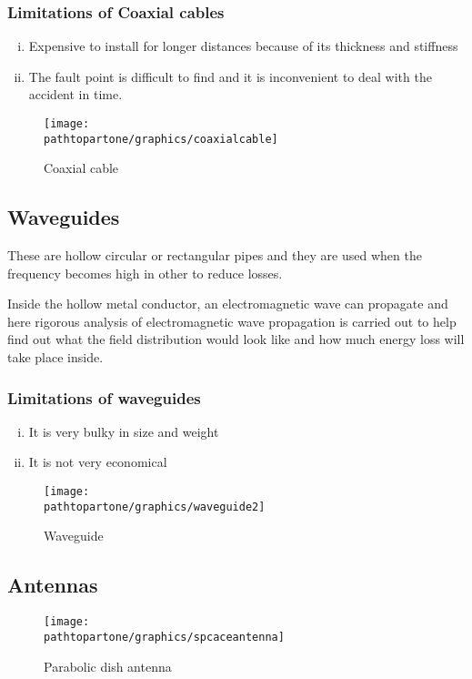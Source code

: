 \subsubsection{Limitations of Coaxial cables}
\begin{enumerate}[(i)]
\item Expensive to install for longer distances because of its thickness and stiffness
\item The fault point is difficult to find and it is inconvenient to deal with the accident in time.
\end{enumerate}

\begin{figure}[h]
\centering
\texttt{[image: \\pathtopartone/graphics/coaxialcable]}
\caption{Coaxial cable}
\end{figure}

\subsection{Waveguides}
These are hollow circular or rectangular pipes and they are used when the frequency becomes high in other to reduce losses. 

Inside the hollow metal conductor, an electromagnetic wave can propagate and here rigorous analysis of electromagnetic wave propagation is carried out to help find out what the field distribution would look like and how much energy loss will take place inside.

\subsubsection{Limitations of waveguides}
\begin{enumerate}[(i)]
\item It is very bulky in size and weight
\item It is not very economical
\end{enumerate}

\begin{figure}[h]
\centering
\texttt{[image: \\pathtopartone/graphics/waveguide2]}
\caption{Waveguide}
\end{figure}

\subsection{Antennas}
\begin{figure}[h]
\centering
\texttt{[image: \\pathtopartone/graphics/spcaceantenna]}
\caption{Parabolic dish antenna}
\label{fig:spaceantenna}
\end{figure}

